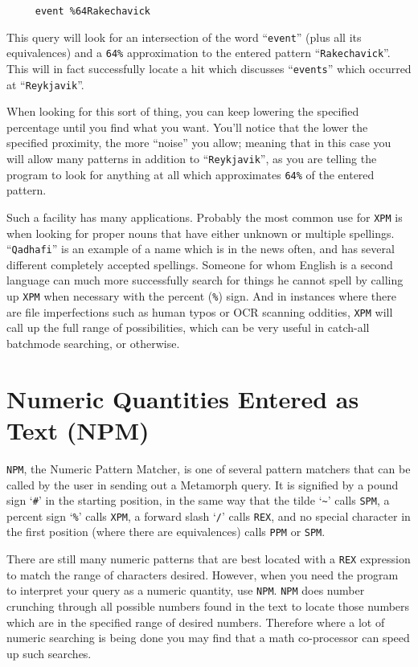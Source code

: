 \begin{verbatim}
     event %64Rakechavick
\end{verbatim}

This query will look for an intersection of the word ``\verb`event`''
(plus all its equivalences) and a \verb`64%` approximation to the
entered pattern ``\verb`Rakechavick`''.  This will in fact
successfully locate a hit which discusses ``\verb`events`'' which
occurred at ``\verb`Reykjavik`''.

When looking for this sort of thing, you can keep lowering the
specified percentage until you find what you want.  You'll notice that
the lower the specified proximity, the more ``noise'' you allow;
meaning that in this case you will allow many patterns in addition to
``\verb`Reykjavik`'', as you are telling the program to look for
anything at all which approximates \verb`64%` of the entered pattern.

Such a facility has many applications.  Probably the most common use
for \verb`XPM` is when looking for proper nouns that have either
unknown or multiple spellings.  ``\verb`Qadhafi`'' is an example of a
name which is in the news often, and has several different completely
accepted spellings.  Someone for whom English is a second language can
much more successfully search for things he cannot spell by calling up
\verb`XPM` when necessary with the percent (\verb`%`) sign.  And in
instances where there are file imperfections such as human typos or
OCR scanning oddities, \verb`XPM` will call up the full range of
possibilities, which can be very useful in catch-all batchmode
searching, or otherwise.


\section{Numeric Quantities Entered as Text (NPM)}

\verb`NPM`, the Numeric Pattern Matcher, is one of several pattern
matchers that can be called by the user in sending out a Metamorph
query.  It is signified by a pound sign `\verb`#`' in the starting
position, in the same way that the tilde `\verb`~`' calls \verb`SPM`,
a percent sign `\verb`%`' calls \verb`XPM`, a forward slash `\verb`/`'
calls \verb`REX`, and no special character in the first position
(where there are equivalences) calls \verb`PPM` or \verb`SPM`.

There are still many numeric patterns that are best located with a
\verb`REX` expression to match the range of characters desired.
However, when you need the program to interpret your query as a
numeric quantity, use \verb`NPM`.  \verb`NPM` does number crunching
through all possible numbers found in the text to locate those numbers
which are in the specified range of desired numbers.  Therefore where
a lot of numeric searching is being done you may find that a math
co-processor can speed up such searches.

